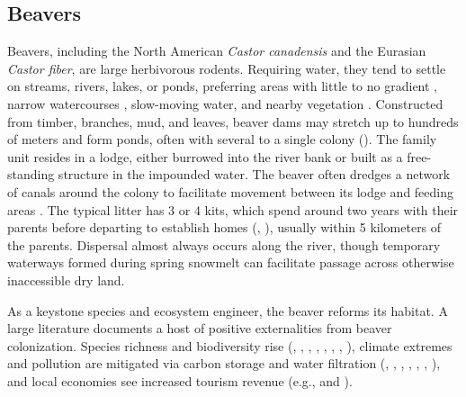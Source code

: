 \subsection{Beavers}
\label{sec:background-beavers}
Beavers, including the North American \textit{Castor canadensis} and the Eurasian \textit{Castor fiber}, are large herbivorous rodents. Requiring water, they tend to settle on streams, rivers, lakes, or ponds, preferring areas with little to no gradient \citep{muller-schwarze_beaver_2011}, narrow watercourses \citep{dittbrenner_modeling_2018}, slow-moving water, and nearby vegetation \citep{swinnen_environmental_2019}. Constructed from timber, branches, mud, and leaves, beaver dams may stretch up to hundreds of meters and form ponds, often with several to a single colony (\cite{muller-schwarze_beaver_2011}). The family unit resides in a lodge, either burrowed into the river bank or built as a free-standing structure in the impounded water. The beaver often dredges a network of canals around the colony to facilitate movement between its lodge and feeding areas \citep{muller-schwarze_beaver_2011}. The typical litter has 3 or 4 kits, which spend around two years with their parents before departing to establish homes (\cite{hartman_notes_1997}, \cite{muller-schwarze_beaver_2011}), usually within 5 kilometers of the parents. Dispersal almost always occurs along the river, though temporary waterways formed during spring snowmelt can facilitate passage across otherwise inaccessible dry land. 

As a keystone species and ecosystem engineer, the beaver reforms its habitat. A large literature documents a host of positive externalities from beaver colonization. Species richness and biodiversity rise (\cite{hossack_trends_2015}, \cite{wright_ecosystem_2002}, \cite{leidholt-bruner_beaver_1992}, \cite{bouwes_ecosystem_2016}, \cite{fedyn_beyond_2023}, \cite{kemp_qualitative_2012}, \cite{stringer_impacts_2016}, \cite{law_habitat_2016}), climate extremes and pollution are mitigated via carbon storage and water filtration (\cite{hood_beaver_2008}, \cite{dewey_beaver_2022}, \cite{johnston_beaver_2014}, \cite{fairfax_using_2018}, \cite{fairfax_smokey_2020}, \cite{lazar_beaver_2015}, \cite{wohl_landscape-scale_2013}), and local economies see increased tourism revenue (e.g., \cite{campbell_economic_2007} and \cite{auster_wildlife_2020}).

